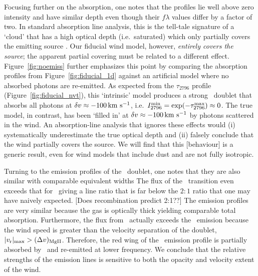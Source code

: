 \documentclass[12pt,preprint]{aastex}
\begin{document}
Focusing further on the  absorption, one notes that the profiles lie
well above zero intensity and have similar depth even though their $f\lambda$
values differ by a factor of two.  In standard absorption line
analysis, this is 
the tell-tale signature of a `cloud' that has a high optical depth (i.e.\
saturated) which only partially covers the emitting source
\citep[e.g.][]{hammann+10}.  Our fiducial wind model, however, 
{\it entirely covers the source}; the apparent partial covering must
be related to a different effect.
Figure~\ref{fig:noemiss} further emphasizes this point by comparing the 
absorption profiles from Figure~\ref{fig:fiducial_1d} against an
artificial model where no absorbed photons are 
re-emitted.   As expected from the
$\tau_{2796}$ profile (Figure~\ref{fig:fiducial_nvt}), this
`intrinsic' model
produces a strong \mgiid\ doublet that absorbs all photons at
$\delta v \approx -100 \, {\rm km~s^{-1}}$, i.e.\ $I_{2796}^{\rm min} = \exp(-\tau^{\rm
  max}_{2796}) \approx 0$.
The true model, in contrast, has been `filled in' at $\delta v \approx -100
\, {\rm km~s^{-1}}$ by photons scattered in the wind.  An
absorption-line analysis that ignores these effects
would (i) systematically underestimate the true optical
depth and (ii) falsely conclude that the wind partially covers the
source.  We will find that this
[behaviour] is a generic result, even for wind models that include
dust and are not fully isotropic.

Turning to the emission profiles of the \mgiid\ doublet, one notes
that they are also similar with comparable equivalent widths The
flux of the \mgiib\ transition even exceeds that for \mgiia\ giving a
line ratio that is far below the $2:1$ ratio that one may have naively
expected. 
[Does recombination predict 2:1??]
The emission profiles are very similar because the gas is optically
thick yielding comparable total absorption. 
Furthermore, the flux from \mgiib\ actually exceeds the
\mgiia\ emission because the wind speed is greater than the velocity separation
of the doublet, $|v_{\rm r}|_{\rm max} > (\Delta v)_{\rm MgII}$.
Therefore, the red wing of the
\mgiia\ emission profile is partially absorbed by \mgiib\ and
re-emitted at lower frequency.  We conclude that the relative
strengths of the emission lines is sensitive to both the opacity and
velocity extent of the wind.   
\end{document}
